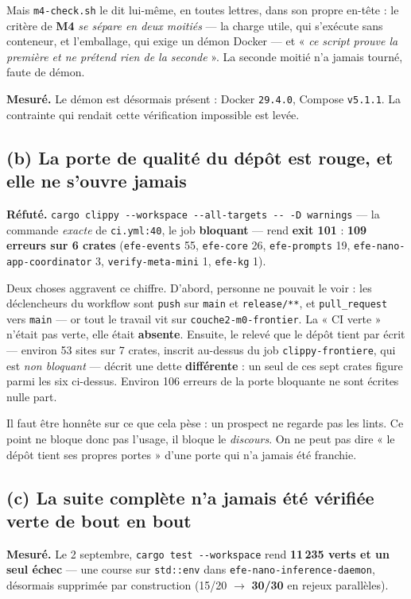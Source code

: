 \documentclass[11pt]{article}
\newcommand{\code}[1]{\texttt{\small #1}}
\newcommand{\best}[1]{{\color{efesolve}\textbf{#1}}}
\newcommand{\pire}[1]{{\color{efered}\textbf{#1}}}
\newcommand{\mm}[1]{\textbf{#1}}
\newcommand{\mesure}[1]{{\color{efeteal}\textbf{Mesuré.} }#1\par}
\newcommand{\refute}[1]{{\color{efered}\textbf{Réfuté.} }#1\par}
\newcommand{\fl}{$\rightarrow$}
\begin{document}
Mais \code{m4-check.sh} le dit lui-même, en toutes lettres, dans son propre en-tête : le critère de
\mm{M4} \emph{se sépare en deux moitiés} --- la charge utile, qui s'exécute sans conteneur, et
l'emballage, qui exige un démon Docker --- et « \emph{ce script prouve la première et ne prétend rien
de la seconde} ». La seconde moitié n'a jamais tourné, faute de démon.

\mesure{Le démon est désormais présent : Docker \code{29.4.0}, Compose \code{v5.1.1}. La contrainte
qui rendait cette vérification impossible est levée.}

\subsection{(b) La porte de qualité du dépôt est rouge, et elle ne s'ouvre jamais}
\refute{\code{cargo clippy -{}-workspace -{}-all-targets -{}- -D warnings} --- la commande
\emph{exacte} de \code{ci.yml:40}, le job \textbf{bloquant} --- rend \pire{exit 101} :
\textbf{109 erreurs sur 6 crates} (\code{efe-events} 55, \code{efe-core} 26, \code{efe-prompts} 19,
\code{efe-nano-app-coordinator} 3, \code{verify-meta-mini} 1, \code{efe-kg} 1).}

Deux choses aggravent ce chiffre. D'abord, personne ne pouvait le voir : les déclencheurs du workflow
sont \code{push} sur \code{main} et \code{release/**}, et \code{pull\_request} vers \code{main} ---
or tout le travail vit sur \code{couche2-m0-frontier}. La « CI verte » n'était pas verte, elle était
\textbf{absente}. Ensuite, le relevé que le dépôt tient par écrit --- environ 53 sites sur 7 crates,
inscrit au-dessus du job \code{clippy-frontiere}, qui est \emph{non bloquant} --- décrit une dette
\textbf{différente} : un seul de ces sept crates figure parmi les six ci-dessus. Environ 106 erreurs
de la porte bloquante ne sont écrites nulle part.

Il faut être honnête sur ce que cela pèse : un prospect ne regarde pas les lints. Ce point ne bloque
donc pas l'usage, il bloque le \emph{discours}. On ne peut pas dire « le dépôt tient ses propres
portes » d'une porte qui n'a jamais été franchie.

\subsection{(c) La suite complète n'a jamais été vérifiée verte de bout en bout}
\mesure{Le 2 septembre, \code{cargo test -{}-workspace} rend \textbf{11\,235 verts et un seul échec}
--- une course sur \code{std::env} dans \code{efe-nano-inference-daemon}, désormais supprimée par
construction (15/20 \fl{} \best{30/30} en rejeux parallèles).}
\end{document}

